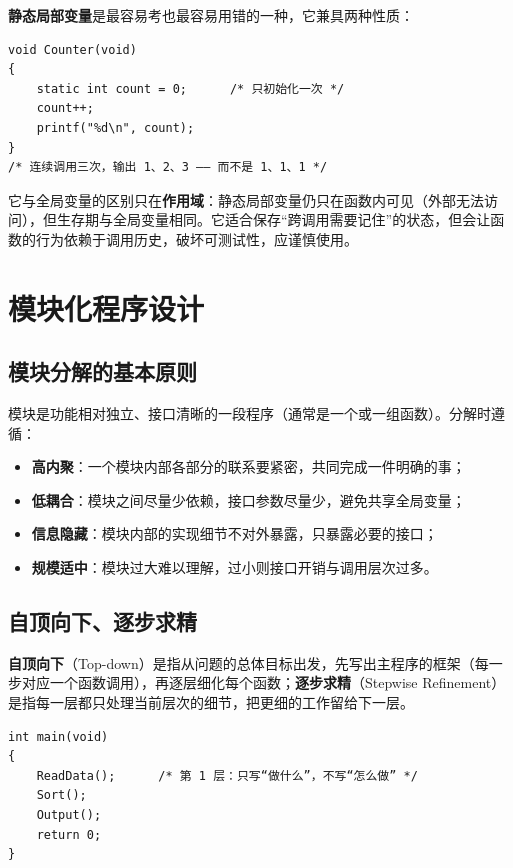 \textbf{静态局部变量}是最容易考也最容易用错的一种，它兼具两种性质：

\begin{lstlisting}
void Counter(void)
{
    static int count = 0;      /* 只初始化一次 */
    count++;
    printf("%d\n", count);
}
/* 连续调用三次，输出 1、2、3 —— 而不是 1、1、1 */
\end{lstlisting}

它与全局变量的区别只在\textbf{作用域}：静态局部变量仍只在函数内可见（外部无法访问），但生存期与全局变量相同。它适合保存“跨调用需要记住”的状态，但会让函数的行为依赖于调用历史，破坏可测试性，应谨慎使用。

\section{模块化程序设计}

\subsection{模块分解的基本原则}

模块是功能相对独立、接口清晰的一段程序（通常是一个或一组函数）。分解时遵循：

\begin{itemize}
  \item \textbf{高内聚}：一个模块内部各部分的联系要紧密，共同完成一件明确的事；
  \item \textbf{低耦合}：模块之间尽量少依赖，接口参数尽量少，避免共享全局变量；
  \item \textbf{信息隐藏}：模块内部的实现细节不对外暴露，只暴露必要的接口；
  \item \textbf{规模适中}：模块过大难以理解，过小则接口开销与调用层次过多。
\end{itemize}

\subsection{自顶向下、逐步求精}

\textbf{自顶向下}（Top-down）是指从问题的总体目标出发，先写出主程序的框架（每一步对应一个函数调用），再逐层细化每个函数；\textbf{逐步求精}（Stepwise Refinement）是指每一层都只处理当前层次的细节，把更细的工作留给下一层。

\begin{lstlisting}
int main(void)
{
    ReadData();      /* 第 1 层：只写“做什么”，不写“怎么做” */
    Sort();
    Output();
    return 0;
}
\end{lstlisting}

